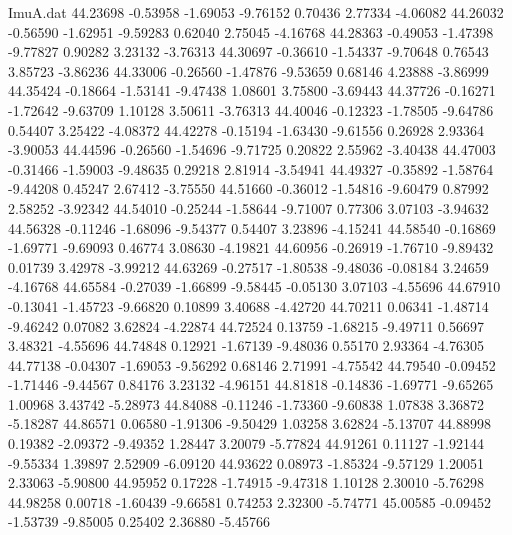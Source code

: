 \begin{filecontents}{ImuA.dat}
  44.23698   -0.53958   -1.69053   -9.76152    0.70436    2.77334   -4.06082
  44.26032   -0.56590   -1.62951   -9.59283    0.62040    2.75045   -4.16768
  44.28363   -0.49053   -1.47398   -9.77827    0.90282    3.23132   -3.76313
  44.30697   -0.36610   -1.54337   -9.70648    0.76543    3.85723   -3.86236
  44.33006   -0.26560   -1.47876   -9.53659    0.68146    4.23888   -3.86999
  44.35424   -0.18664   -1.53141   -9.47438    1.08601    3.75800   -3.69443
  44.37726   -0.16271   -1.72642   -9.63709    1.10128    3.50611   -3.76313
  44.40046   -0.12323   -1.78505   -9.64786    0.54407    3.25422   -4.08372
  44.42278   -0.15194   -1.63430   -9.61556    0.26928    2.93364   -3.90053
  44.44596   -0.26560   -1.54696   -9.71725    0.20822    2.55962   -3.40438
  44.47003   -0.31466   -1.59003   -9.48635    0.29218    2.81914   -3.54941
  44.49327   -0.35892   -1.58764   -9.44208    0.45247    2.67412   -3.75550
  44.51660   -0.36012   -1.54816   -9.60479    0.87992    2.58252   -3.92342
  44.54010   -0.25244   -1.58644   -9.71007    0.77306    3.07103   -3.94632
  44.56328   -0.11246   -1.68096   -9.54377    0.54407    3.23896   -4.15241
  44.58540   -0.16869   -1.69771   -9.69093    0.46774    3.08630   -4.19821
  44.60956   -0.26919   -1.76710   -9.89432    0.01739    3.42978   -3.99212
  44.63269   -0.27517   -1.80538   -9.48036   -0.08184    3.24659   -4.16768
  44.65584   -0.27039   -1.66899   -9.58445   -0.05130    3.07103   -4.55696
  44.67910   -0.13041   -1.45723   -9.66820    0.10899    3.40688   -4.42720
  44.70211    0.06341   -1.48714   -9.46242    0.07082    3.62824   -4.22874
  44.72524    0.13759   -1.68215   -9.49711    0.56697    3.48321   -4.55696
  44.74848    0.12921   -1.67139   -9.48036    0.55170    2.93364   -4.76305
  44.77138   -0.04307   -1.69053   -9.56292    0.68146    2.71991   -4.75542
  44.79540   -0.09452   -1.71446   -9.44567    0.84176    3.23132   -4.96151
  44.81818   -0.14836   -1.69771   -9.65265    1.00968    3.43742   -5.28973
  44.84088   -0.11246   -1.73360   -9.60838    1.07838    3.36872   -5.18287
  44.86571    0.06580   -1.91306   -9.50429    1.03258    3.62824   -5.13707
  44.88998    0.19382   -2.09372   -9.49352    1.28447    3.20079   -5.77824
  44.91261    0.11127   -1.92144   -9.55334    1.39897    2.52909   -6.09120
  44.93622    0.08973   -1.85324   -9.57129    1.20051    2.33063   -5.90800
  44.95952    0.17228   -1.74915   -9.47318    1.10128    2.30010   -5.76298
  44.98258    0.00718   -1.60439   -9.66581    0.74253    2.32300   -5.74771
  45.00585   -0.09452   -1.53739   -9.85005    0.25402    2.36880   -5.45766

\end{filecontents}
